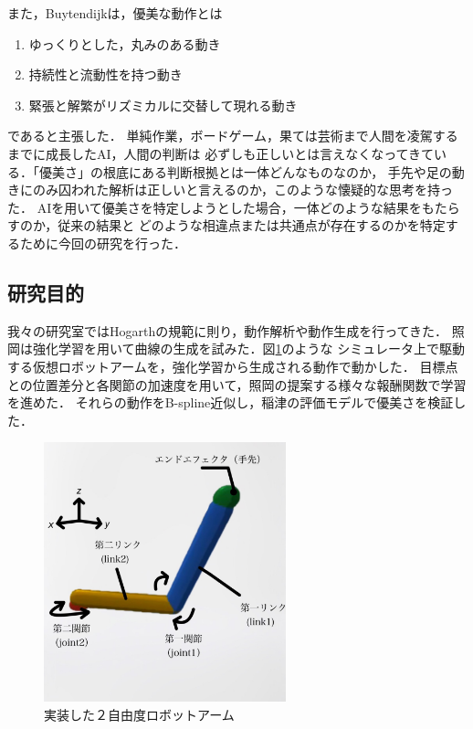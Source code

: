 \clearpage

また，Buytendijkは，優美な動作とは
\begin{enumerate}
  \item ゆっくりとした，丸みのある動き
  \item 持続性と流動性を持つ動き
  \item 緊張と解繁がリズミカルに交替して現れる動き
\end{enumerate}
であると主張した．
単純作業，ボードゲーム，果ては芸術まで人間を凌駕するまでに成長したAI，人間の判断は
必ずしも正しいとは言えなくなってきている．「優美さ」の根底にある判断根拠とは一体どんなものなのか，
手先や足の動きにのみ囚われた解析は正しいと言えるのか，このような懐疑的な思考を持った．
AIを用いて優美さを特定しようとした場合，一体どのような結果をもたらすのか，従来の結果と
どのような相違点または共通点が存在するのかを特定するために今回の研究を行った．

\subsection{研究目的}
我々の研究室ではHogarthの規範に則り，動作解析や動作生成を行ってきた．
照岡\cite{teruoka}は強化学習を用いて曲線の生成を試みた．図\ref{robot_arm}のような
シミュレータ上で駆動する仮想ロボットアームを，強化学習から生成される動作で動かした．
目標点との位置差分と各関節の加速度を用いて，照岡の提案する様々な報酬関数で学習を進めた．
それらの動作をB-spline近似\cite{bspline}し，稲津\cite{inadu}の評価モデルで優美さを検証した．

\begin{figure}[b]
  \begin{center}
   \includegraphics[width=70mm]{images/robot_arm.png}
  \end{center}
  \caption{実装した２自由度ロボットアーム}
  \label{robot_arm}
\end{figure}

